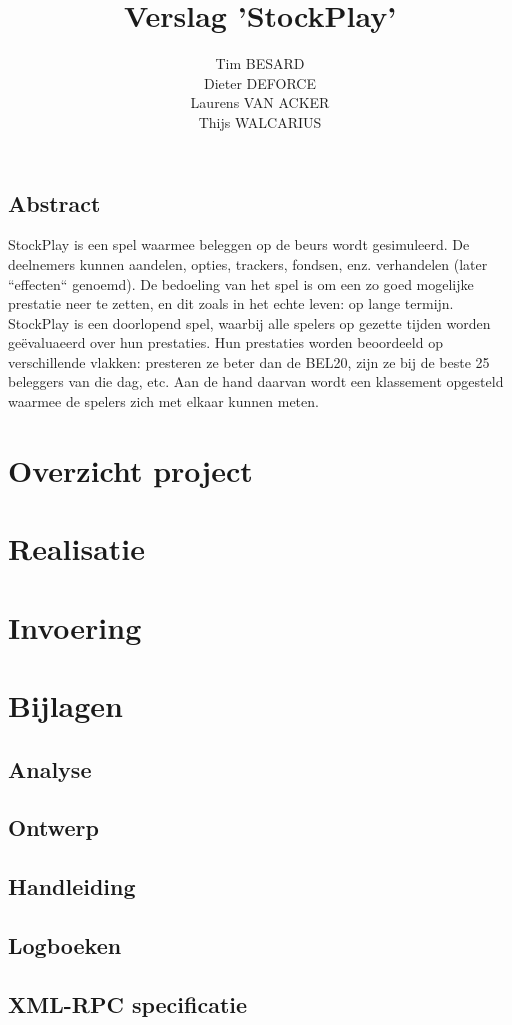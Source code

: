 \documentclass[a4paper,oneside,final]{memoir}
\title{Verslag 'StockPlay'}
\author{
Tim BESARD\\
Dieter DEFORCE\\
Laurens VAN ACKER\\
Thijs WALCARIUS
}
\begin{document}
\maketitle
{}
\tableofcontents
{}


%
%

\chapter*{Abstract}
StockPlay is een spel waarmee beleggen op de beurs wordt gesimuleerd. De deelnemers kunnen aandelen, opties, trackers, fondsen, enz. verhandelen (later ``effecten`` genoemd). De bedoeling van het spel is om een zo goed mogelijke prestatie neer te zetten, en dit zoals in het echte leven: op lange termijn. StockPlay is een doorlopend spel, waarbij alle spelers op gezette tijden worden ge\"evaluaeerd over hun prestaties. Hun prestaties worden beoordeeld op verschillende vlakken: presteren ze beter dan de BEL20, zijn ze bij de beste 25 beleggers van die dag, etc. Aan de hand daarvan wordt een klassement opgesteld waarmee de spelers zich met elkaar kunnen meten.

\part{Overzicht project}
\label{pt:overzicht}


\part{Realisatie}
\label{pt:realisatie}


\part{Invoering}
\label{pt:invoering}


%
%

\part{Bijlagen}
\label{pt:bijlagen}
\appendix
\chapter{Analyse}
\label{pt:analyse}


\chapter{Ontwerp}
\label{chap:ontwerp}


\chapter{Handleiding}
\label{chap:installatie}


\chapter{Logboeken}
\label{chap:logboeken}


\chapter{XML-RPC specificatie}
\label{chap:xmlrpc}

\end{document}
